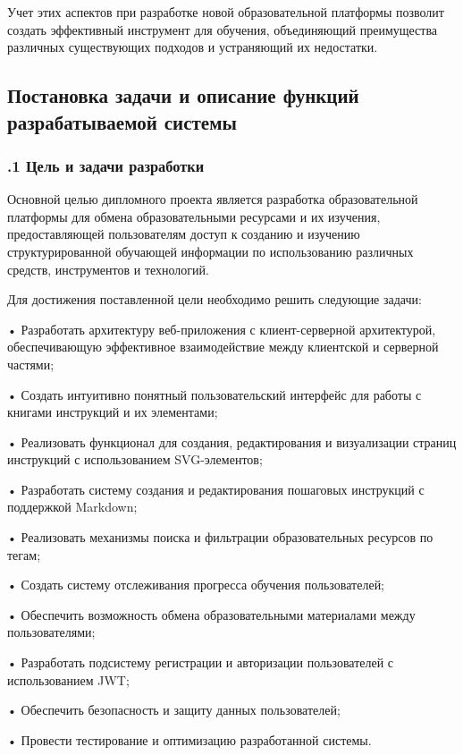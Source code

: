 {  \par \redline Учет этих аспектов при разработке новой образовательной платформы позволит создать эффективный инструмент для обучения, объединяющий преимущества различных существующих подходов и устраняющий их недостатки.

  \par
}



\subsection*{
  \gostTitleFont
   Постановка задачи и описание функций разрабатываемой системы
}

\titlespace

\subsubsection*{ 
  \gostTitleFont
  .1 Цель и задачи разработки
} 

\subtitlespace

{\gostFont

  \par \redline Основной целью дипломного проекта является разработка образовательной платформы для обмена образовательными ресурсами и их изучения, предоставляющей пользователям доступ к созданию и изучению структурированной обучающей информации по использованию различных средств, инструментов и технологий.

  \par \redline Для достижения поставленной цели необходимо решить следующие задачи:

  \par \redline • Разработать архитектуру веб-приложения с клиент-серверной архитектурой, обеспечивающую эффективное взаимодействие между клиентской и серверной частями;
  \par \redline • Создать интуитивно понятный пользовательский интерфейс для работы с книгами инструкций и их элементами;
  \par \redline • Реализовать функционал для создания, редактирования и визуализации страниц инструкций с использованием SVG-элементов;
  \par \redline • Разработать систему создания и редактирования пошаговых инструкций с поддержкой Markdown;
  \par \redline • Реализовать механизмы поиска и фильтрации образовательных ресурсов по тегам;
  \par \redline • Создать систему отслеживания прогресса обучения пользователей;
  \par \redline • Обеспечить возможность обмена образовательными материалами между пользователями;
  \par \redline • Разработать подсистему регистрации и авторизации пользователей с использованием JWT;
  \par \redline • Обеспечить безопасность и защиту данных пользователей;
  \par \redline • Провести тестирование и оптимизацию разработанной системы.

  \par
}

